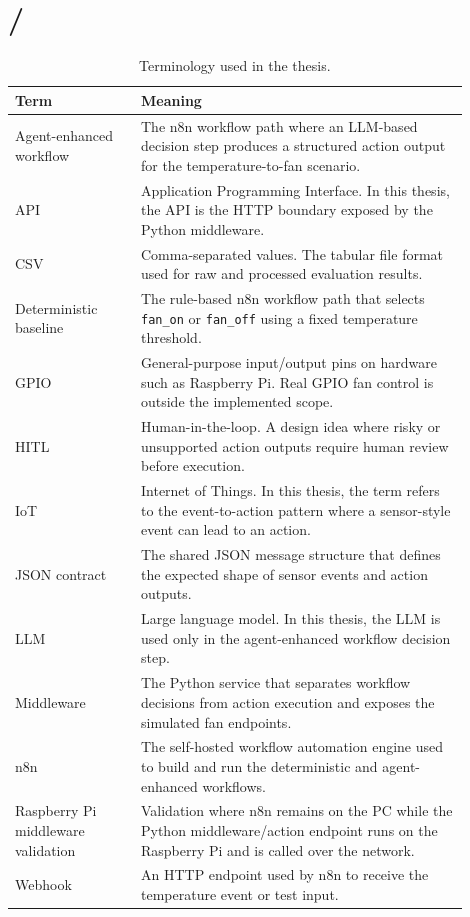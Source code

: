\section*{/}\label{sec:terminology}
{}

\begin{table}[ht!]
	\caption{Terminology used in the thesis.}
	\label{tab:terminology}
	\begin{tabular}{@{}p{0.25\linewidth}p{0.65\linewidth}@{}}
		\toprule
		Term & Meaning \\
		\midrule
		Agent-enhanced workflow & The n8n workflow path where an LLM-based decision step produces a structured action output for the temperature-to-fan scenario. \\
		API & Application Programming Interface. In this thesis, the API is the HTTP boundary exposed by the Python middleware. \\
		CSV & Comma-separated values. The tabular file format used for raw and processed evaluation results. \\
		Deterministic baseline & The rule-based n8n workflow path that selects \texttt{fan\_on} or \texttt{fan\_off} using a fixed temperature threshold. \\
		GPIO & General-purpose input/output pins on hardware such as Raspberry Pi. Real GPIO fan control is outside the implemented scope. \\
		HITL & Human-in-the-loop. A design idea where risky or unsupported action outputs require human review before execution. \\
		IoT & Internet of Things. In this thesis, the term refers to the event-to-action pattern where a sensor-style event can lead to an action. \\
		JSON contract & The shared JSON message structure that defines the expected shape of sensor events and action outputs. \\
		LLM & Large language model. In this thesis, the LLM is used only in the agent-enhanced workflow decision step. \\
		Middleware & The Python service that separates workflow decisions from action execution and exposes the simulated fan endpoints. \\
		n8n & The self-hosted workflow automation engine used to build and run the deterministic and agent-enhanced workflows. \\
		Raspberry Pi middleware validation & Validation where n8n remains on the PC while the Python middleware/action endpoint runs on the Raspberry Pi and is called over the network. \\
		Webhook & An HTTP endpoint used by n8n to receive the temperature event or test input. \\
		\bottomrule
	\end{tabular}
\end{table}